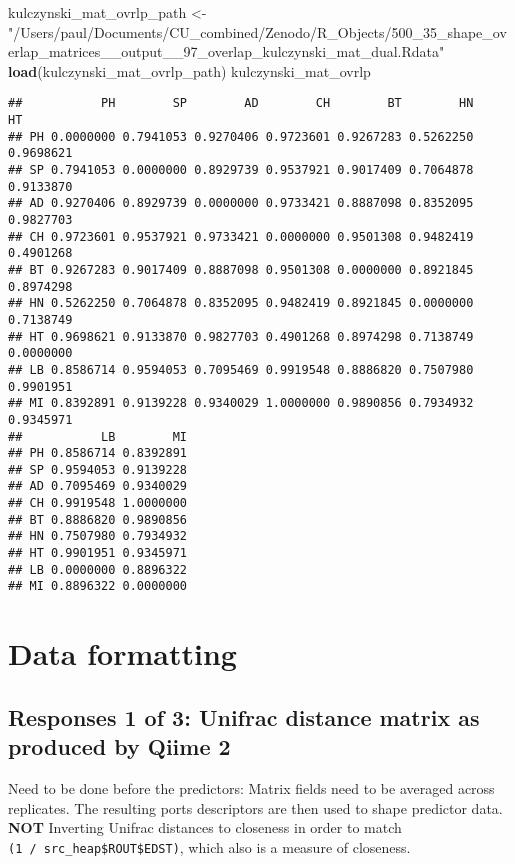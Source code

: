 \documentclass[]{article}
\newenvironment{Shaded}{\begin{snugshade}}{\end{snugshade}}
\newcommand{\KeywordTok}[1]{\textcolor[rgb]{0.13,0.29,0.53}{\textbf{#1}}}
\newcommand{\StringTok}[1]{\textcolor[rgb]{0.31,0.60,0.02}{#1}}
\newcommand{\NormalTok}[1]{#1}
\begin{document}
\begin{Shaded}
\begin{Highlighting}[]
\NormalTok{kulczynski_mat_ovrlp_path <-}\StringTok{ "/Users/paul/Documents/CU_combined/Zenodo/R_Objects/500_35_shape_overlap_matrices__output__97_overlap_kulczynski_mat_dual.Rdata"}
\KeywordTok{load}\NormalTok{(kulczynski_mat_ovrlp_path)}
\NormalTok{kulczynski_mat_ovrlp}
\end{Highlighting}
\end{Shaded}

\begin{verbatim}
##           PH        SP        AD        CH        BT        HN        HT
## PH 0.0000000 0.7941053 0.9270406 0.9723601 0.9267283 0.5262250 0.9698621
## SP 0.7941053 0.0000000 0.8929739 0.9537921 0.9017409 0.7064878 0.9133870
## AD 0.9270406 0.8929739 0.0000000 0.9733421 0.8887098 0.8352095 0.9827703
## CH 0.9723601 0.9537921 0.9733421 0.0000000 0.9501308 0.9482419 0.4901268
## BT 0.9267283 0.9017409 0.8887098 0.9501308 0.0000000 0.8921845 0.8974298
## HN 0.5262250 0.7064878 0.8352095 0.9482419 0.8921845 0.0000000 0.7138749
## HT 0.9698621 0.9133870 0.9827703 0.4901268 0.8974298 0.7138749 0.0000000
## LB 0.8586714 0.9594053 0.7095469 0.9919548 0.8886820 0.7507980 0.9901951
## MI 0.8392891 0.9139228 0.9340029 1.0000000 0.9890856 0.7934932 0.9345971
##           LB        MI
## PH 0.8586714 0.8392891
## SP 0.9594053 0.9139228
## AD 0.7095469 0.9340029
## CH 0.9919548 1.0000000
## BT 0.8886820 0.9890856
## HN 0.7507980 0.7934932
## HT 0.9901951 0.9345971
## LB 0.0000000 0.8896322
## MI 0.8896322 0.0000000
\end{verbatim}

\section{Data formatting}\label{data-formatting}

\subsection{Responses 1 of 3: Unifrac distance matrix as produced by
Qiime
2}\label{responses-1-of-3-unifrac-distance-matrix-as-produced-by-qiime-2-1}

Need to be done before the predictors: Matrix fields need to be averaged
across replicates. The resulting ports descriptors are then used to
shape predictor data. \textbf{NOT} Inverting Unifrac distances to
closeness in order to match \texttt{(1\ /\ src\_heap\$ROUT\$EDST)},
which also is a measure of closeness.
\end{document}
